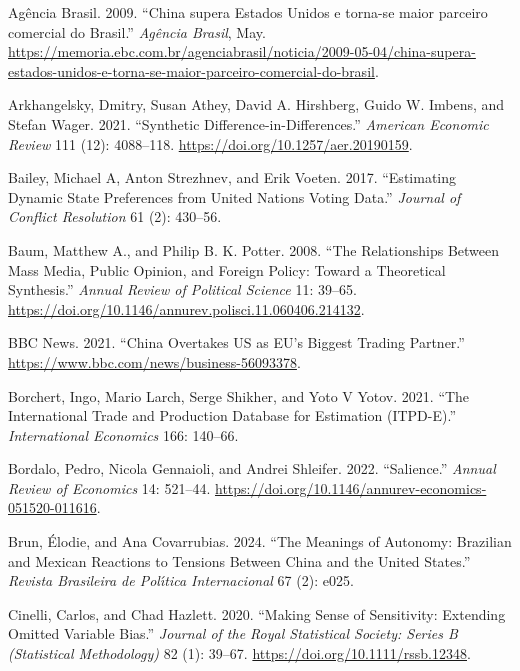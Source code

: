 \documentclass[
  12pt,
]{article}
\newlength{\cslhangindent}
\newenvironment{CSLReferences}[2] %
 {\begin{list}{}{%
  \setlength{\itemindent}{0pt}
  \setlength{\leftmargin}{0pt}
  \setlength{\parsep}{0pt}
  \ifodd #1
   \setlength{\leftmargin}{\cslhangindent}
   \setlength{\itemindent}{-1\cslhangindent}
  \fi
  \setlength{\itemsep}{#2\baselineskip}}}
 {\end{list}}
\begin{document}
\protect{}\label{refs}
\begin{CSLReferences}{1}{0}
Agência Brasil. 2009. {``China supera Estados Unidos e torna-se maior parceiro comercial do Brasil.''} \emph{Agência Brasil}, May. \url{https://memoria.ebc.com.br/agenciabrasil/noticia/2009-05-04/china-supera-estados-unidos-e-torna-se-maior-parceiro-comercial-do-brasil}.

Arkhangelsky, Dmitry, Susan Athey, David A. Hirshberg, Guido W. Imbens, and Stefan Wager. 2021. {``Synthetic {Difference-in-Differences}.''} \emph{American Economic Review} 111 (12): 4088--118. \url{https://doi.org/10.1257/aer.20190159}.

Bailey, Michael A, Anton Strezhnev, and Erik Voeten. 2017. {``Estimating Dynamic State Preferences from {United Nations} Voting Data.''} \emph{Journal of Conflict Resolution} 61 (2): 430--56.

Baum, Matthew A., and Philip B. K. Potter. 2008. {``The {Relationships Between Mass Media}, {Public Opinion}, and {Foreign Policy}: {Toward} a {Theoretical Synthesis}.''} \emph{Annual Review of Political Science} 11: 39--65. \url{https://doi.org/10.1146/annurev.polisci.11.060406.214132}.

BBC News. 2021. {``China Overtakes {US} as {EU}'s Biggest Trading Partner.''} \url{https://www.bbc.com/news/business-56093378}.

Borchert, Ingo, Mario Larch, Serge Shikher, and Yoto V Yotov. 2021. {``The International Trade and Production Database for Estimation ({ITPD-E}).''} \emph{International Economics} 166: 140--66.

Bordalo, Pedro, Nicola Gennaioli, and Andrei Shleifer. 2022. {``Salience.''} \emph{Annual Review of Economics} 14: 521--44. \url{https://doi.org/10.1146/annurev-economics-051520-011616}.

Brun, Élodie, and Ana Covarrubias. 2024. {``The Meanings of Autonomy: {Brazilian} and Mexican Reactions to Tensions Between China and the United States.''} \emph{Revista Brasileira de Pol{ı́}tica Internacional} 67 (2): e025.

Cinelli, Carlos, and Chad Hazlett. 2020. {``Making Sense of Sensitivity: Extending Omitted Variable Bias.''} \emph{Journal of the Royal Statistical Society: Series B (Statistical Methodology)} 82 (1): 39--67. \url{https://doi.org/10.1111/rssb.12348}.


\end{CSLReferences}
\end{document}
